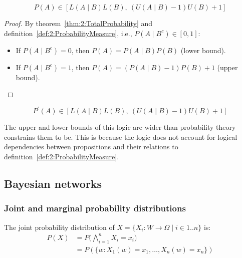 \begin{thm}
  \begin{equation}
    P(A) \in [L(A \mid B) L(B),\ (U(A \mid B) - 1) U(B) + 1]
  \end{equation}
  \begin{proof}
    By theorem~\ref{thm:2:TotalProbability} and
    definition~\ref{def:2:ProbabilityMeasure}, i.e., $P(A \mid B^c) \in [0, 1]$:
    \begin{itemize}
      \item If $P(A \mid B^c) = 0$, then $P(A) = P(A \mid B) P(B)$ (lower bound).
      \item If $P(A \mid B^c) = 1$, then $P(A) = (P(A \mid B) - 1) P(B) + 1$ (upper bound).
    \end{itemize}
  \end{proof}
\end{thm}

\begin{thm}
  \begin{equation}
    P^\prime(A) \in [L(A \mid B) L(B),\ (U(A \mid B) - 1) U(B) + 1]
  \end{equation}
\end{thm}

The upper and lower bounds of this logic are wider than probability theory
constrains them to be.
This is because the logic does not account for logical dependencies between
propositions and their relations to definition~\ref{def:2:ProbabilityMeasure}.

\subsection{Bayesian networks}

\subsubsection{Joint and marginal probability distributions}

\begin{dfn}
  The joint probability distribution of
  ${X = \{ X_i : W \to \Omega \mid i \in 1 .. n \}}$ is:
  \begin{align}
    P(X)
     & = P \bigl( \bigwedge_{i = 1}^{n} X_i = x_i \bigr) \nonumber \\
     & = P(\{ w : X_1(w) = x_1, \ldots, X_n(w) = x_n \})
  \end{align}
\end{dfn}


